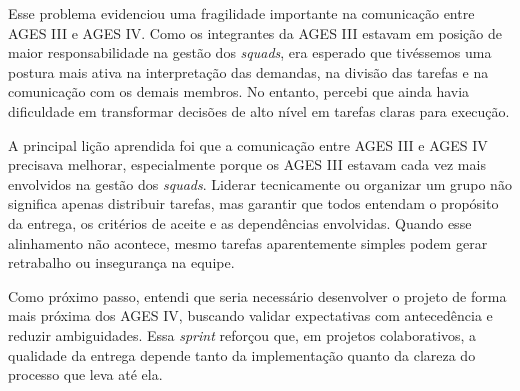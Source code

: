 Esse problema evidenciou uma fragilidade importante na comunicação entre \ac{AGES} III e \ac{AGES} IV. Como os integrantes da \ac{AGES} III estavam em posição de maior responsabilidade na gestão dos \textit{squads}, era esperado que tivéssemos uma postura mais ativa na interpretação das demandas, na divisão das tarefas e na comunicação com os demais membros. No entanto, percebi que ainda havia dificuldade em transformar decisões de alto nível em tarefas claras para execução.

A principal lição aprendida foi que a comunicação entre \ac{AGES} III e \ac{AGES} IV precisava melhorar, especialmente porque os \ac{AGES} III estavam cada vez mais envolvidos na gestão dos \textit{squads}. Liderar tecnicamente ou organizar um grupo não significa apenas distribuir tarefas, mas garantir que todos entendam o propósito da entrega, os critérios de aceite e as dependências envolvidas. Quando esse alinhamento não acontece, mesmo tarefas aparentemente simples podem gerar retrabalho ou insegurança na equipe.

Como próximo passo, entendi que seria necessário desenvolver o projeto de forma mais próxima dos \ac{AGES} IV, buscando validar expectativas com antecedência e reduzir ambiguidades. Essa \textit{sprint} reforçou que, em projetos colaborativos, a qualidade da entrega depende tanto da implementação quanto da clareza do processo que leva até ela.
